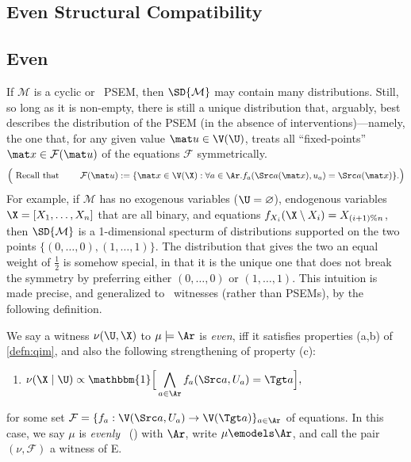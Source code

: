 \begin{subappendices}
{\section{Even Structural Compatibility}

\subsection{Even \SCibility}

If $\mathcal M$ is a cyclic or \subpartl\ PSEM, then $\SD{\mathcal M}$ may 
contain many distributions. Still, so long as it is non-empty, there is
still a unique distribution that, arguably, best describes the distribution of the PSEM (in the absence of interventions)---namely, the one that, for any given value $\mat u \in \V(\U)$, treats all ``fixed-points''
$\mat x \in \mathcal F(\mat u)$ of the equations $\mathcal F$ symmetrically.
\[
\Big(\text{ Recall that }\qquad
\mathcal F(\mat u) := \{\mat x \in \V(\X) : \forall a \in \Ar. f_a(\Src a(\mat x), u_a) = \Src a(\mat x) \}.
 \Big)
\]
For example, if $\mathcal M$ has 
no exogenous variables ($\U = \varnothing$),
endogenous variables $\X = [X_1, \ldots, X_n]$ that are all binary, 
and equations 
$f_{X_i}(\X\setminus X_i) = X_{(i+1)\% n}$,
then $\SD{\mathcal M}$ is a 1-dimensional specturm of distributions
    supported on the two points $\{ (0, \ldots, 0), (1, \ldots, 1) \}$. 
The distribution that gives the two an equal weight of $\frac12$ is somehow special, in that it is the unique one that does not break the symmetry by preferring either $(0, \ldots, 0)$ or $(1, \ldots, 1)$. 
This intuition is made precise, and generalized to \scibility\ witnesses (rather than PSEMs), by the following definition.

\begin{defn}
        \label{defn:esim-compat}
    We say a witness $\nu(\U,\X)$ to $\mu \models \Ar$ is \emph{even}, iff
    it satisfies properties (a,b) of \cref{defn:qim}, and also
    the following strengthening of property (c):
    \begin{enumerate}[start=4,label={(\alph*)}, nosep]
    \item $\displaystyle
        \nu(\X \mid \U) \propto \mathbbm{1}\Big[ \bigwedge_{a \in \Ar}
            f_a(\Src a, U_a) = \Tgt a \Big],
    $
    \end{enumerate}
    for some set
    $
    \mathcal F = 
    \{ f_a : \V(\Src a, U_a) \to \V(\Tgt a) \}_{a \in \Ar}
    $
     of equations.
     In this case, we say $\mu$ is \emph{evenly} \scible\ (\escible) with $\Ar$,
     write $\mu \emodels \Ar$, and 
    call the pair $(\nu, \mathcal F)$ a witness of E\scibility.
\end{defn}

}
\end{subappendices}
